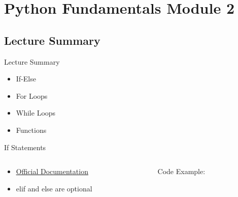 \section{Python Fundamentals Module 2}

\subsection{Lecture Summary}
\begin{Slide}{Lecture Summary}
  \begin{itemize}
  \item If-Else
  \item For Loops
  \item While Loops
  \item Functions
  \end{itemize}
\end{Slide}

% 
% 
% 
\begin{Slide}{If Statements}
  \begin{columns}
    \begin{column}{.48\textwidth}
      
      \begin{itemize}
      \item \underline{\href{https://docs.python.org/3/tutorial/controlflow.html\#if-statements}{Official Documentation}}
      \item elif and else are optional
      \end{itemize}
      
      
    \end{column}

    \hfill

    \begin{column}{.48\textwidth}
      Code Example:
      
    \inputminted[firstline=3,
      lastline=11,
      breaklines,
      fontsize=\tiny,
      bgcolor=Background,
      linenos]{python}{../src/ifexample.py}
      
      
    \end{column}
  \end{columns}

\end{Slide}

